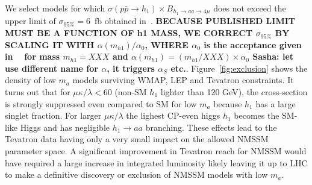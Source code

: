 \documentclass[aps,prl,twocolumn,nofootinbib,superscriptaddress]{revtex4}
\begin{document}
{We select models for which 
$\sigma(p\bar{p} \to h_1) \times B_{h_1 \to aa \to 4\mu}$ does not exceed the upper limit of 
$\sigma_{95\%}=6$~fb obtained in~\cite{d0-low-ma}. {\bf BECAUSE 
PUBLISHED LIMIT MUST BE A FUNCTION OF h1 MASS, WE CORRECT $\sigma_{95\%}$ BY SCALING IT WITH $\alpha(m_{h1})/ \alpha_0$,
WHERE $\alpha_0$ is the acceptance given in ~\cite{d0-low-ma} 
for mass $m_{h1}=XXX$ and $\alpha(m_{h1}) = (m_{h1}/XXX) \times \alpha_0$
Sasha: let use different name for $\alpha$, it triggers $\alpha_S$ etc.}. 
Figure~\ref{fig:exclusion} shows the density of low $m_a$ models surviving WMAP, LEP and Tevatron constraints. 
It turns out that for $\mu\kappa/\lambda<60$ (non-SM $h_1$ lighter than 120 GeV), the cross-section 
is strongly suppressed even compared to SM for low $m_a$ because $h_1$ has a large singlet fraction. For 
larger $\mu\kappa/\lambda$ the lighest CP-even higgs $h_1$ becomes the SM-like Higgs and has negligible 
$h_1 \to aa$ branching.  These effects lead to the Tevatron data having only a very small impact on the allowed 
NMSSM parameter space. A significant improvement in Tevatron reach for NMSSM would have required a large increase 
in integrated luminosity likely leaving it up to LHC to make a definitive discovery or exclusion of
NMSSM models with low $m_a$.



}
\end{document}
